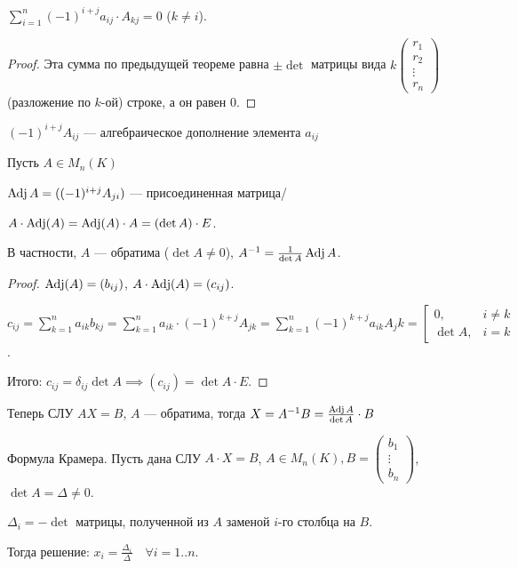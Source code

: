 \begin{consequence}
    $\sum_{i=1}^n (-1)^{i+j} a_{ij} \cdot A_{kj} = 0$ ($k \neq i$).
\end{consequence}
\begin{proof}
    Эта сумма по предыдущей теореме равна $\pm \det$ матрицы вида  $k \begin{pmatrix} r_1 \\ r_2 \\ \vdots \\ r_n \end{pmatrix}$ (разложение по $k$-ой) строке, а он равен 0.
\end{proof}
\begin{definition}
    $(-1)^{i+j}A_{ij}$ --- алгебраическое дополнение элемента  $a_{ij}$
\end{definition}
\begin{definition}
    Пусть $A \in M_n(K)$

    $\operatorname{Adj} A = ((-1)^{i+j}A_{ji})$ --- присоединенная матрица/ 
\end{definition}
\begin{theorem}
    $A \cdot \operatorname{Adj}(A) = \operatorname{Adj}(A) \cdot A = (\det A) \cdot E$.

    В частности, $A$ --- обратима ($\det A \neq 0$), $A^{-1} = \frac{1}{\det A} \operatorname{Adj} A$.
\end{theorem}
\begin{proof}
    $\operatorname{Adj}(A) = (b_{ij})$,  $A \cdot \operatorname{Adj}(A) = (c_{ij})$.

    $c_{ij} = \sum\limits_{k=1}^n a_{ik} b_{kj} = \sum\limits_{k=1}^n a_{ik} \cdot (-1)^{k+j} A_{jk} = \sum\limits_{k=1}^n (-1)^{k+j} a_{ik}A_jk = \left[ \begin{array}{ll} 0, & i \neq k \\ \det A, & i = k\end{array} \right.$.

    Итого: $c_{ij} = \delta_{ij} \det A \implies (c_{ij}) = \det A \cdot E$.
\end{proof}
\begin{remark}
    Теперь СЛУ $AX = B$,  $A$ --- обратима, тогда  $X = A^{-1}B = \frac{\operatorname{Adj} A}{\det A} \cdot B$
\end{remark}
\begin{theorem}
    Формула Крамера. Пусть дана СЛУ $A \cdot X = B$,  $A \in M_n(K), B = \begin{pmatrix} b_1 \\ \vdots \\ b_n \end{pmatrix}$, $\det A = \Delta \neq 0$.

     $\Delta_i = -\det$ матрицы, полученной из  $A$ заменой  $i$-го столбца на  $B$. 

     Тогда решение:  $x_i = \frac{\Delta_i}{\Delta} \quad \forall i=1..n$.
\end{theorem}
